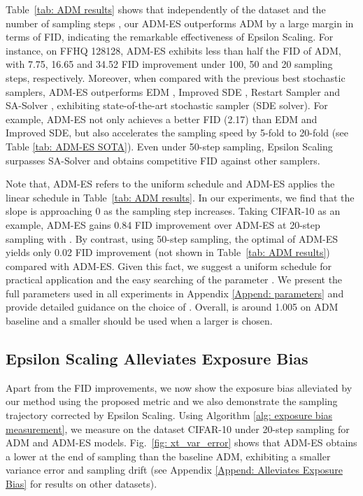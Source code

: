 \documentclass{article} \usepackage{iclr2024_conference,times}
\begin{document}
Table~\ref{tab: ADM results} shows that independently of the dataset and the number of sampling steps , our ADM-ES outperforms ADM by a large margin in terms of FID, indicating the remarkable effectiveness of Epsilon Scaling. For instance, on FFHQ 128128, ADM-ES exhibits less than half the FID of ADM, with 7.75, 16.65 and 34.52 FID improvement under 100, 50 and 20 sampling steps, respectively. Moreover, when compared with the previous best stochastic samplers, ADM-ES outperforms EDM \citep{karras2022elucidating}, Improved SDE \citep{karras2022elucidating}, Restart Sampler \citep{xu2023restart} and SA-Solver \citep{xue2023sa}, exhibiting state-of-the-art stochastic sampler (SDE solver). For example, ADM-ES not only achieves a better FID (2.17) than EDM and Improved SDE, but also accelerates the sampling speed by 5-fold to 20-fold (see Table \ref{tab: ADM-ES SOTA}). Even under 50-step sampling, Epsilon Scaling surpasses SA-Solver and obtains competitive FID against other samplers. 


Note that, ADM-ES refers to the uniform schedule  and ADM-ES applies the linear schedule  in Table~\ref{tab: ADM results}. In our experiments, we find that the slope  is approaching 0 as the sampling step  increases. Taking CIFAR-10 as an example, ADM-ES gains 0.84 FID improvement over ADM-ES at 20-step sampling with . By contrast, using 50-step sampling, the optimal  of ADM-ES yields only 0.02 FID improvement (not shown in Table~\ref{tab: ADM results}) compared with ADM-ES. Given this fact, we suggest a uniform schedule  for practical application and the easy searching of the parameter . We present the full parameters  used in all experiments in Appendix \ref{Append: parameters} and provide detailed guidance on the choice of . Overall,  is around 1.005 on ADM baseline and a smaller  should be used when a larger  is chosen. 


\subsection{Epsilon Scaling Alleviates Exposure Bias}
\label{sec: alleviate exposure bias}
Apart from the FID improvements, we now show the exposure bias alleviated by our method using the proposed metric  and we also demonstrate the sampling trajectory corrected by Epsilon Scaling. Using Algorithm \ref{alg: exposure bias measurement}, we measure  on the dataset CIFAR-10 under 20-step sampling for ADM and ADM-ES models. Fig.~\ref{fig: xt_var_error} shows that ADM-ES obtains a lower  at the end of sampling  than the baseline ADM, exhibiting a smaller variance error and sampling drift (see Appendix \ref{Append: Alleviates Exposure Bias} for results on other datasets). 
\end{document}
